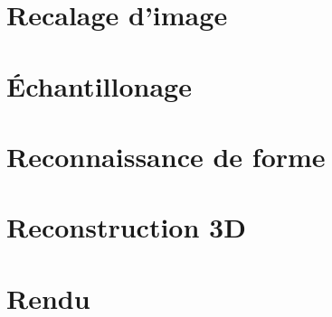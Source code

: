 \section{Recalage d'image}
\section{\'Echantillonage}
\section{Reconnaissance de forme}
\section{Reconstruction 3D}
\section{Rendu}